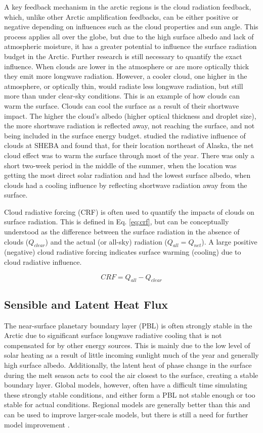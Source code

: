 A key feedback mechanism in the arctic regions is the cloud radiation feedback, which, unlike other Arctic amplification feedbacks, can be either positive or negative depending on influences such as the cloud properties and sun angle. This process applies all over the globe, but due to the high surface albedo and lack of atmospheric moisture, it has a greater potential to influence the surface radiation budget in the Arctic. Further research is still necessary to quantify the exact influence. When clouds are lower in the atmosphere or are more optically thick they emit more longwave radiation. However, a cooler cloud, one higher in the atmosphere, or optically thin, would radiate less longwave radiation, but still more than under clear-sky conditions. This is an example of how clouds can warm the surface. Clouds can cool the surface as a result of their shortwave impact. The higher the cloud's albedo (higher optical thickness and droplet size), the more shortwave radiation is reflected away, not reaching the surface, and not being included in the surface energy budget. \citet{intrieri:2002} studied the radiative influence of clouds at SHEBA and found that, for their location northeast of Alaska, the net cloud effect was to warm the surface through most of the year. There was only a short two-week period in the middle of the summer, when the location was getting the most direct solar radiation and had the lowest surface albedo, when clouds had a cooling influence by reflecting shortwave radiation away from the surface. 

Cloud radiative forcing (CRF) is often used to quantify the impacts of clouds on surface radiation. This is defined in Eq. \ref{eq:crf}, but can be conceptually understood as the difference between the surface radiation in the absence of clouds ($Q_{clear}$) and the actual (or all-sky) radiation ($Q_{all} = Q_{net}$). A large positive (negative) cloud radiative forcing indicates surface warming (cooling) due to cloud radiative influence. 

\begin{equation}\label{eq:crf}
CRF = Q_{all} - Q_{clear} 
\end{equation}

\subsection{Sensible and Latent Heat Flux}
The near-surface planetary boundary layer (PBL) is often strongly stable in the Arctic due to significant surface longwave radiative cooling that is not compensated for by other energy sources. This is mainly due to the low level of solar heating as a result of little incoming sunlight much of the year and generally high surface albedo. Additionally, the latent heat of phase change in the surface during the melt season acts to cool the air closest to the surface, creating a stable boundary layer. Global models, however, often have a difficult time simulating these strongly stable conditions, and either form a PBL not stable enough or too stable for actual conditions. Regional models are generally better than this and can be used to improve larger-scale models, but there is still a need for further model improvement \citep{tjernstrom:2005}. 

